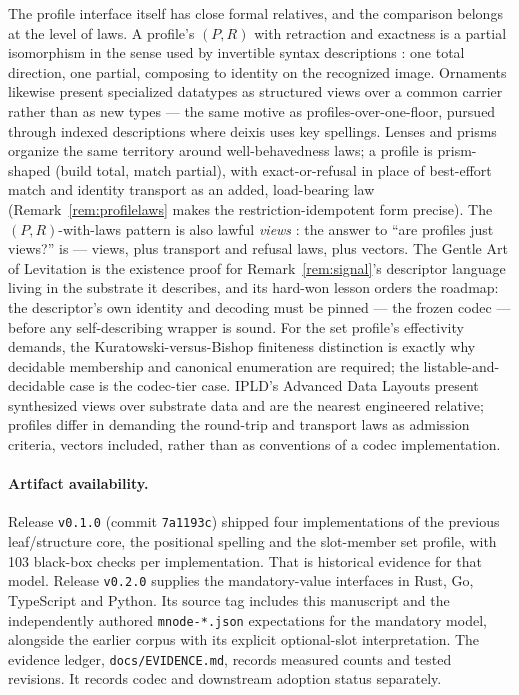 \documentclass[11pt]{article}
\theoremstyle{definition}
\begin{document}
The profile interface itself has close formal relatives, and the comparison belongs
at the level of laws. A profile's $(P, R)$ with retraction and exactness is a partial
isomorphism in the sense used by invertible syntax descriptions
\cite{rendel}: one total direction, one partial, composing to identity on the
recognized image. Ornaments \cite{ornaments} likewise present specialized datatypes
as structured views over a common carrier rather than as new types --- the same
motive as profiles-over-one-floor, pursued through indexed descriptions where deixis
uses key spellings. Lenses and prisms \cite{lenses} organize the same territory
around well-behavedness laws; a profile is prism-shaped (build total, match partial),
with exact-or-refusal in place of best-effort match and identity transport as an
added, load-bearing law (Remark~\ref{rem:profilelaws} makes the restriction-idempotent
form precise). The $(P,R)$-with-laws pattern is also lawful \emph{views}
\cite{wadler,mckinnaviews}: the answer to ``are profiles just views?'' is --- views,
plus transport and refusal laws, plus vectors. The Gentle Art of Levitation
\cite{levitation} is the existence proof for Remark~\ref{rem:signal}'s descriptor
language living in the substrate it describes, and its hard-won lesson orders the
roadmap: the descriptor's own identity and decoding must be pinned --- the frozen
codec --- before any self-describing wrapper is sound. For the set profile's
effectivity demands, the Kuratowski-versus-Bishop finiteness distinction
\cite{hottfinsets} is exactly why decidable membership and canonical enumeration are
required; the listable-and-decidable case is the codec-tier case. IPLD's Advanced
Data Layouts present synthesized views over substrate data \cite{ipldadl} and are
the nearest engineered relative; profiles differ in demanding the round-trip and
transport laws as admission criteria, vectors included, rather than as conventions
of a codec implementation.

\paragraph{Artifact availability.}
Release \texttt{v0.1.0} (commit \texttt{7a1193c}) shipped four implementations of
the previous leaf/structure core, the positional spelling and the slot-member set
profile, with 103 black-box checks per implementation. That is historical evidence
for that model. Release \texttt{v0.2.0} supplies the mandatory-value interfaces in
Rust, Go, TypeScript and Python. Its source tag includes this manuscript and the
independently authored \texttt{mnode-*.json} expectations for the mandatory model,
alongside the earlier corpus with its explicit optional-slot interpretation.
The evidence ledger, \texttt{docs/EVIDENCE.md}, records measured counts and tested
revisions. It records codec and downstream adoption status separately.
\end{document}
